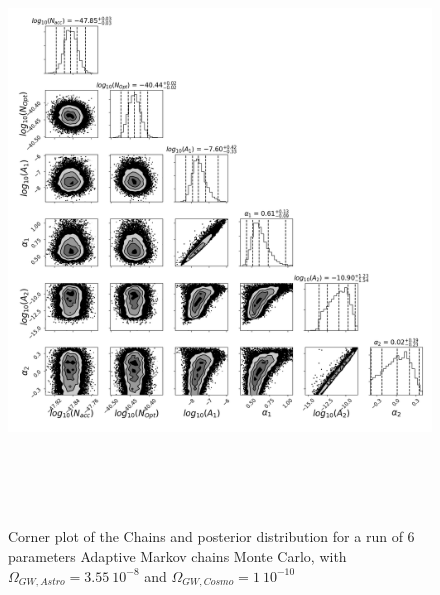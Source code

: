 \documentclass[a4paper,12pt]{article}
\begin{document}
\begin{figure}[H]
    \centering
    \includegraphics[height= 16cm]{covarince/McMC6param/corners.png}
    \caption{Corner plot of the Chains and posterior distribution for a run of 6 parameters Adaptive Markov chains Monte Carlo, with $\Omega_{GW,Astro} = 3.55 \ 10^{-8}$ and  $\Omega_{GW,Cosmo} = 1 \ 10^{-10}$}
    \label{fig:Corner6param}
\end{figure}
\end{document}
